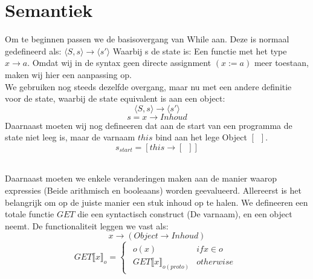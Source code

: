 \documentclass[12pt]{article}
\begin{document}
\section{Semantiek}
Om te beginnen passen we de basisovergang van While aan. Deze is normaal gedefineerd als:
$ \langle S,s \rangle \rightarrow \langle s\prime \rangle $
Waarbij s de state is: Een functie met het type
$ x \rightarrow a $.
Omdat wij in de syntax geen directe assignment $(x := a)$ meer toestaan, maken wij hier een aanpassing op.\\
We gebruiken nog steeds dezelfde overgang, maar nu met een andere definitie voor de state, waarbij de state equivalent is aan een object:
\[ \langle S,s \rangle \rightarrow \langle s\prime \rangle \]
\[ s = x \rightarrow Inhoud \]
Daarnaast moeten wij nog defineeren dat aan de start van een programma de state niet leeg is, maar de varnaam $ this $ bind aan het lege Object $ [\enspace] $.
\[ s_{start} = [this \rightarrow [\enspace]]\]
\\
\par
Daarnaast moeten we enkele veranderingen maken aan de manier waarop expressies (Beide arithmisch en booleaans) worden geevalueerd. Allereerst is het belangrijk om op de juiste manier een stuk inhoud op te halen. We defineeren een totale functie $ GET $ die een syntactisch construct (De varnaam), en een object neemt. De functionaliteit leggen we vast als:
\[ x \rightarrow (Object \rightarrow Inhoud) \]
\[
GET\llbracket x \rrbracket_o =
\begin{cases}
\begin{matrix}
o(x) & if x \in o\\
GET\llbracket x \rrbracket_{o(proto)} & otherwise
\end{matrix}


\end{cases}
\]

\appendix
\end{document}
